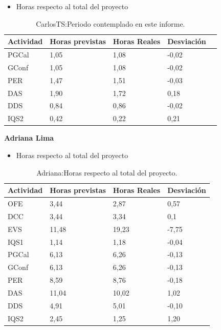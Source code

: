 \begin{itemize}
\item Horas respecto al total del proyecto
\end{itemize}
\begin{table}[H]
\begin{center}
\begin{tabular}{ l l l l l }
  Actividad & Horas previstas & Horas Reales & Desviación \\ \hline \hline

PGCal	&	1,05	&	1,08	&	-0,02	\\ \hline
GConf	&	1,05	&	1,08	&	-0,02	\\ \hline
PER	&	1,47	&	1,51	&	-0,03	\\ \hline
DAS	&	1,90	&	1,72	&	0,18	\\ \hline
DDS	&	0,84	&	0,86	&	-0,02	\\ \hline
IQS2	&	0,42	&	0,22	&	0,21	\\ \hline
\end{tabular}
\caption{CarlosTS:Periodo contemplado en este informe.}
\label{tab:CarlosTS:PeriodoContempladoInforme_2}
\end{center}
\end{table}


\newpage


\textbf{Adriana Lima}
\begin{itemize}
\item Horas respecto al total del proyecto
\end{itemize}
\begin{table}[H]
\begin{center}
\begin{tabular}{ l l l l }
	Actividad & Horas previstas & Horas Reales & Desviación \\ \hline \hline
OFE	&	3,44	&	2,87	&	0,57	\\ \hline
DCC	&	3,44	&	3,34	&	0,1	\\ \hline
EVS	&	11,48	&	19,23	&	-7,75	\\ \hline
IQS1	&	1,14	&	1,18	&	-0,04	\\ \hline
PGCal	&	6,13	&	6,26	&	-0,13	\\ \hline
GConf	&	6,13	&	6,26	&	-0,13	\\ \hline
PER	&	8,59	&	8,76	&	-0,18	\\ \hline
DAS	&	11,04	&	10,02	&	1,02	\\ \hline
DDS	&	4,91	&	5,01	&	-0,10	\\ \hline
IQS2	&	2,45	&	1,25	&	1,20	\\ \hline
\end{tabular}
\caption{Adriana:Horas respecto al total del proyecto.}
\label{tab:Adriana:HorasTotalInforme_2}
\end{center}
\end{table}

